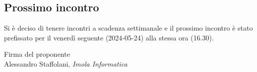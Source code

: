 \documentclass[a4paper, 11pt]{article}
\begin{document}
\subsection{Prossimo incontro}

Si è deciso di tenere incontri a scadenza settimanale e il prossimo incontro è stato prefissato per il venerdì seguente (2024-05-24) alla stessa ora (16.30).

\vspace{60pt}
\begin{flushleft}
\hfill Firma del proponente \\
\vspace{50pt}
\hfill Alessandro Staffolani, \textit{Imola Informatica}
\end{flushleft}
\end{document}
